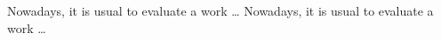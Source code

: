 \EndTitlePage
 \endtitlepage %



\TitlePage
  \vspace*{55mm}
       {Nowadays, it is usual to evaluate a work \ldots}
  \vspace*{5mm}
       {Nowadays, it is usual to evaluate a work \ldots}
\EndTitlePage
\titlepage\
\endtitlepage %



\TitlePage
\EndTitlePage

